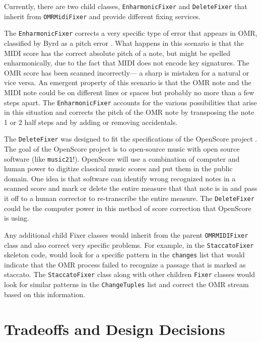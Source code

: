 Currently, there are two child classes, \texttt{EnharmonicFixer} and \texttt{DeleteFixer} that inherit from \texttt{OMRMidiFixer} and provide different fixing services. 

The \texttt{EnharmonicFixer} corrects a very specific type of error that appears in OMR, classified by Byrd as a pitch error \cite{byrd-testbed}. What happens in this scenario is that the MIDI score has the correct absolute pitch of a note, but might be spelled enharmonically, due to the fact that MIDI does not encode key signatures. The OMR score has been scanned incorrectly--- a sharp is mistaken for a natural or vice versa. An emergent property of this scenario is that the OMR note and the MIDI note could be on different lines or spaces but probably no more than a few steps apart. The \texttt{EnharmonicFixer} accounts for the various possibilities that arise in this situation and corrects the pitch of the OMR note by transposing the note 1 or 2 half steps and by adding or removing accidentals.

The \texttt{DeleteFixer} was designed to fit the specifications of the OpenScore project \cite{openscore}. The goal of the OpenScore project is to open-source music with open source software (like \texttt{music21}!). OpenScore will use a combination of computer and human power to digitize classical music scores and put them in the public domain. One idea is that software can identify wrong recognized notes in a scanned score and mark or delete the entire measure that that note is in and pass it off to a human corrector to re-transcribe the entire measure. The \texttt{DeleteFixer} could be the computer power in this method of score correction that OpenScore is using.

Any additional child Fixer classes would inherit from the parent \texttt{OMRMIDIFixer} class and also correct very specific problems. For example, in the \texttt{StaccatoFixer} skeleton code, would look for a specific pattern in the \texttt{changes} list that would indicate that the OMR process failed to recognize a passage that is marked as staccato. The \texttt{StaccatoFixer} class along with other children \texttt{Fixer} classes would look for similar patterns in the \texttt{ChangeTuples} list and correct the OMR stream based on this information. 

\section{Tradeoffs and Design Decisions}

